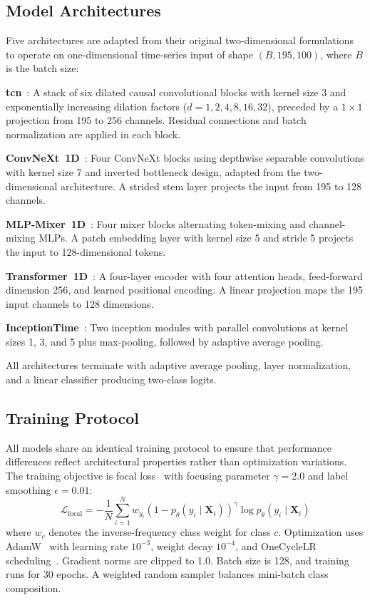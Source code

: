 \documentclass[3p,times,procedia]{elsarticle}
\begin{document}
\subsection{Model Architectures}

Five architectures are adapted from their original two-dimensional formulations to operate on one-dimensional time-series input of shape $(B, 195, 100)$, where $B$ is the batch size:

\textbf{\ac{tcn}}~\cite{bai2020tcn}: A stack of six dilated causal convolutional blocks with kernel size 3 and exponentially increasing dilation factors ($d = 1, 2, 4, 8, 16, 32$), preceded by a $1{\times}1$ projection from 195 to 256 channels. Residual connections and batch normalization are applied in each block.

\textbf{ConvNeXt~1D}~\cite{liu2022convnext}: Four ConvNeXt blocks using depthwise separable convolutions with kernel size 7 and inverted bottleneck design, adapted from the two-dimensional architecture. A strided stem layer projects the input from 195 to 128 channels.

\textbf{MLP-Mixer~1D}~\cite{tolstikhin2021mlpmixer}: Four mixer blocks alternating token-mixing and channel-mixing MLPs. A patch embedding layer with kernel size 5 and stride 5 projects the input to 128-dimensional tokens.

\textbf{Transformer~1D}~\cite{vaswani2017attention}: A four-layer encoder with four attention heads, feed-forward dimension 256, and learned positional encoding. A linear projection maps the 195 input channels to 128 dimensions.

\textbf{InceptionTime}~\cite{fawaz2020inceptiontime}: Two inception modules with parallel convolutions at kernel sizes 1, 3, and 5 plus max-pooling, followed by adaptive average pooling.

All architectures terminate with adaptive average pooling, layer normalization, and a linear classifier producing two-class logits.

\subsection{Training Protocol}

All models share an identical training protocol to ensure that performance differences reflect architectural properties rather than optimization variations. The training objective is focal loss~\cite{lin2017focal} with focusing parameter $\gamma = 2.0$ and label smoothing $\epsilon = 0.01$:
\begin{equation}
    \mathcal{L}_{\text{focal}} = -\frac{1}{N} \sum_{i=1}^{N} w_{y_i} (1 - p_\theta(y_i \mid \mathbf{X}_i))^\gamma \log p_\theta(y_i \mid \mathbf{X}_i)
\end{equation}
where $w_c$ denotes the inverse-frequency class weight for class $c$. Optimization uses AdamW~\cite{loshchilov2019adamw} with learning rate $10^{-3}$, weight decay $10^{-4}$, and OneCycleLR scheduling~\cite{smith2019onecycle}. Gradient norms are clipped to 1.0. Batch size is 128, and training runs for 30 epochs. A weighted random sampler balances mini-batch class composition.
\end{document}
